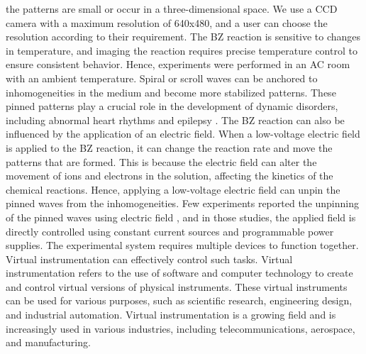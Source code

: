 \documentclass[journal=jacsat,manuscript=article]{achemso}
\begin{document}
the patterns are small or occur in a three-dimensional space. We use a
CCD camera with a maximum resolution of 640x480, and a user can choose
the resolution according to their requirement.  The BZ reaction is
sensitive to changes in temperature, and imaging the reaction requires
precise temperature control to ensure consistent behavior. Hence,
experiments were performed in an AC room with an ambient temperature.
Spiral or scroll waves can be anchored to inhomogeneities in the
medium and become more stabilized patterns. These pinned patterns play
a crucial role in the development of dynamic disorders, including
abnormal heart rhythms \cite{bruser2012automatic}
\cite{kundu2021amplitude} and epilepsy \cite{punacha2020theory}. The
BZ reaction can also be influenced by the application of an electric
field. When a low-voltage electric field is applied to the BZ
reaction, it can change the reaction rate and move the patterns that
are formed. This is because the electric field can alter the movement
of ions and electrons in the solution, affecting the kinetics of the
chemical reactions. Hence, applying a low-voltage electric field can
unpin the pinned waves from the inhomogeneities. Few experiments
reported the unpinning of the pinned waves using electric field
\cite{steinbock1992electric}\cite{ji2013experimental}\cite{jimenez2013electric}\cite{sutthiopad2014unpinning}\cite{porjai2016electrically},
and in those studies, the applied field is directly controlled using
constant current sources and programmable power supplies. The
experimental system requires multiple devices to function together.
Virtual instrumentation can effectively control such tasks. Virtual
instrumentation refers to the use of software and computer technology
to create and control virtual versions of physical instruments. These
virtual instruments can be used for various purposes, such as
scientific research, engineering design, and industrial automation.
Virtual instrumentation is a growing field and is increasingly used in
various industries, including telecommunications, aerospace, and
manufacturing.
\end{document}
